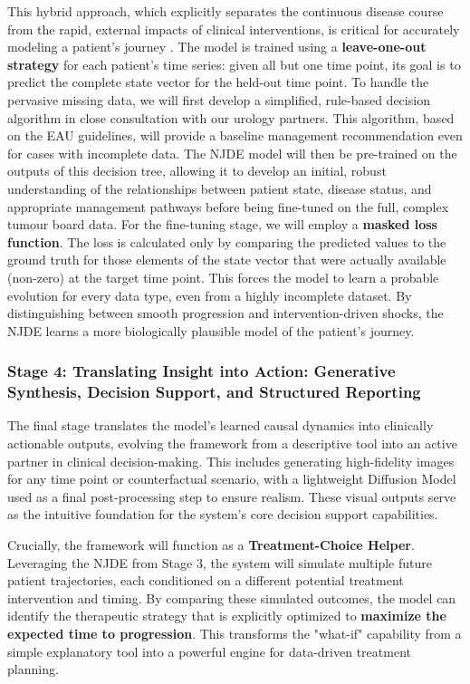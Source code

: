 \documentclass[11pt, a4paper]{article}
\begin{document}
This hybrid approach, which explicitly separates the continuous disease course from the rapid, external impacts of clinical interventions, is critical for accurately modeling a patient's journey \cite{GwakSim2020}. The model is trained using a \textbf{leave-one-out strategy} for each patient's time series: given all but one time point, its goal is to predict the complete state vector for the held-out time point. To handle the pervasive missing data, we will first develop a simplified, rule-based decision algorithm in close consultation with our urology partners. This algorithm, based on the EAU guidelines, will provide a baseline management recommendation even for cases with incomplete data. The NJDE model will then be pre-trained on the outputs of this decision tree, allowing it to develop an initial, robust understanding of the relationships between patient state, disease status, and appropriate management pathways before being fine-tuned on the full, complex tumour board data. For the fine-tuning stage, we will employ a \textbf{masked loss function}. The loss is calculated only by comparing the predicted values to the ground truth for those elements of the state vector that were actually available (non-zero) at the target time point. This forces the model to learn a probable evolution for every data type, even from a highly incomplete dataset. By distinguishing between smooth progression and intervention-driven shocks, the NJDE learns a more biologically plausible model of the patient's journey.

\subsubsection{Stage 4: Translating Insight into Action: Generative Synthesis, Decision Support, and Structured Reporting}
The final stage translates the model's learned causal dynamics into clinically actionable outputs, evolving the framework from a descriptive tool into an active partner in clinical decision-making. This includes generating high-fidelity images for any time point or counterfactual scenario, with a lightweight Diffusion Model used as a final post-processing step to ensure realism. These visual outputs serve as the intuitive foundation for the system's core decision support capabilities.

Crucially, the framework will function as a \textbf{Treatment-Choice Helper}. Leveraging the NJDE from Stage 3, the system will simulate multiple future patient trajectories, each conditioned on a different potential treatment intervention and timing. By comparing these simulated outcomes, the model can identify the therapeutic strategy that is explicitly optimized to \textbf{maximize the expected time to progression}. This transforms the "what-if" capability from a simple explanatory tool into a powerful engine for data-driven treatment planning.
\end{document}
